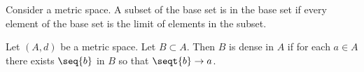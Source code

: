 


Consider a metric space.
A subset of the base set
is  in the base
set if every
element of the base set is
the limit of elements in the
subset.


Let $(A, d)$ be a metric space.
Let $B \subset A$.
Then $B$ is dense in $A$ if
for each $a \in A$ there exists
$\seq{b}$ in $B$ so that
$\seqt{b} \to a$.
